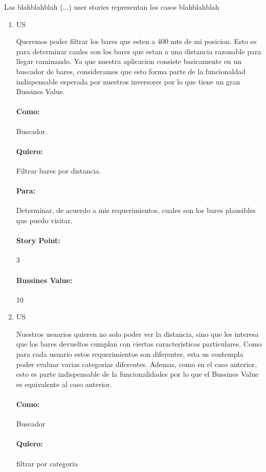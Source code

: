 Las blahblahblah (...) user stories representan los casos blahblahblah

\begin{enumerate}
 \item US
 
Queremos poder filtrar los bares que esten a 400 mts de mi posicion. Esto es para determinar caules son los bares que estan a una distancia razonable para llegar caminando. Ya que nuestra
aplicacion consiste basicamente en un buscador de bares, consideramos que esto forma parte de la funcionaldad indispensable esperada por nuestros inversores %
por lo que tiene un gran Bussines Value.
\paragraph{Como:} Buscador.
\paragraph{Quiero:} Filtrar bares por distancia.
\paragraph{Para:} Determinar, de acuerdo a mis requerimientos, cuales son los bares plausibles que puedo visitar.
\paragraph{Story Point:} 3
\paragraph{Bussines Value:} 10


 \item US
 
Nuestros usuarios quieren no solo poder ver la distancia, sino que les interesa que los bares devueltos cumplan con ciertas caracteristicas particulares. Como para cada usuario estos
requerimientos son diferentes, esta us contempla poder evaluar varias categorias diferentes. Ademas, como en el caso anterior, esto es parte indispensable de la funcionalidades
 por lo que el Bussines Value es equivalente al caso anterior.
\paragraph{Como:} Buscador
\paragraph{Quiero:} filtrar por categoria

\end{enumerate}
